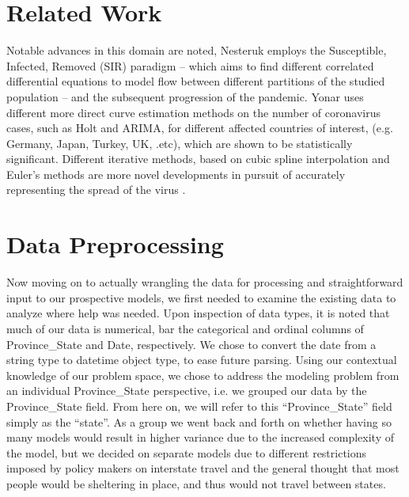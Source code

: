 \documentclass[sigconf,nonacm]{acmart}
\begin{document}
\section{Related Work}
Notable advances in this domain are noted, Nesteruk \cite{Nesteruk} employs the Susceptible, Infected, Removed (SIR) paradigm
– which aims to find different correlated differential equations to model flow between different partitions of the 
studied population – and the subsequent progression of the pandemic. Yonar \cite{EJMO} uses different more direct curve estimation methods
on the number of coronavirus cases, such as Holt and ARIMA, for different affected countries of interest, (e.g. Germany, Japan, Turkey, UK, .etc),
which are shown to be statistically significant. Different iterative methods, based on cubic spline interpolation and Euler's methods
are more novel developments in pursuit of accurately representing the spread of the virus \cite{APPADU2020}.

\section{Data Preprocessing}
Now moving on to actually wrangling the data for processing and straightforward input to our prospective models, 
we first needed to examine the existing data to analyze where help was needed. Upon inspection of data types, it is noted 
that much of our data is numerical, bar the categorical and ordinal columns of Province\_State and Date, respectively. 
We chose to convert the date from a string type to datetime object type, to ease future parsing. 
Using our contextual knowledge of our problem space, we chose to address the modeling problem from an individual 
Province\_State perspective, i.e. we grouped our data by the Province\_State field. 
From here on, we will refer to this “Province\_State” field simply as the “state”. 
As a group we went back and forth on whether having so many models would result in higher variance due to the increased complexity of the model, 
but we decided on separate models due to different restrictions imposed by policy makers on interstate travel and 
the general thought that most people would be sheltering in place, and thus would not travel between states.
\end{document}
